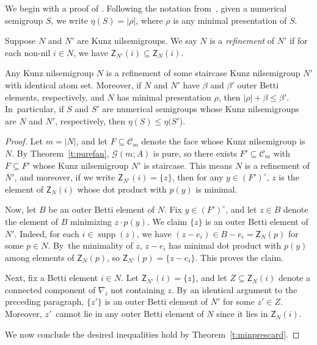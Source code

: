 \documentclass[ALCO, Unicode]{cedram}
\newcommand\cC{{\mathcal C}}
\DeclareMathOperator\supp{supp}
\begin{document}
We begin with a proof of \cite[Conjecture~7.3]{minprescard}.  Following the notation from~\cite{minprescard}, given a numerical semigroup $S$, we write $\eta(S) = |\rho|$, where $\rho$ is any minimal presentation of $S$.  

\begin{defi}\label{d:refinement}
Suppose $N$ and $N'$ are Kunz nilsemigroups.  We say $N$ is a \emph{refinement} of $N'$ if for each non-nil $i \in N$, we have $\mathsf Z_{N'}(i) \subseteq \mathsf Z_N(i)$.  
\end{defi}

\begin{thm}\label{t:nablastaircasebound}
Any Kunz nilsemigroup $N$ is a refinement of some staircase Kunz nilsemigroup $N'$ with identical atom set.  Moreover, if $N$ and $N'$ have $\beta$ and $\beta'$ outer Betti elements, respectively, and $N$ has minimal presentation $\rho$, then $|\rho| + \beta \le \beta'$.  In~particular, if $S$ and $S'$ are numerical semigroups whose Kunz nilsemigroups are $N$ and $N'$, respectively, then $\eta(S) \le \eta(S'$).  
\end{thm}

\begin{proof}
Let $m = |N|$, and let $F \subseteq \cC_m$ denote the face whose Kunz nilsemigroup is $N$.  By Theorem~\ref{t:purefan}, $\mathcal G(m;A)$ is pure, so there exists $F' \subseteq \cC_m$ with $F \subseteq F'$ whose Kunz nilsemigroup $N'$ is staircase.  This means $N$ is a refinement of $N'$, and moreover, if we write $\mathsf Z_{N'}(i) = \{z\}$, then for any $y \in (F')^\circ$, $z$ is the element of $\mathsf Z_N(i)$ whose dot product with $p(y)$ is minimal.  

Now, let $B$ be an outer Betti element of $N$.  Fix $y \in (F')^\circ$, and let $z \in B$ denote the element of $B$ minimizing $z \cdot p(y)$.  We claim $\{z\}$ is an outer Betti element of $N'$.  Indeed, for each $i \in \supp(z)$, we have $(z - e_i) \in B - e_i = \mathsf Z_N(p)$ for some $p \in N$.  By~the minimality of $z$, $z - e_i$ has minimal dot product with $p(y)$ among elements of $\mathsf Z_N(p)$, so $\mathsf Z_{N'}(p) = \{z - e_i\}$.  This proves the claim.  

Next, fix a Betti element $i \in N$.  Let $\mathsf Z_{N'}(i) = \{z\}$, and let $Z \subseteq \mathsf Z_N(i)$ denote a connected component of $\nabla_i$ not containing $z$.  By an identical argument to the preceding paragraph, $\{z'\}$ is an outer Betti element of $N'$ for some $z' \in Z$.  Moreover, $z'$~cannot lie in any outer Betti element of $N$ since it lies in $\mathsf Z_N(i)$.  

We now conclude the desired inequalities hold by Theorem~\ref{t:minprescard}.  
\end{proof}
\end{document}
